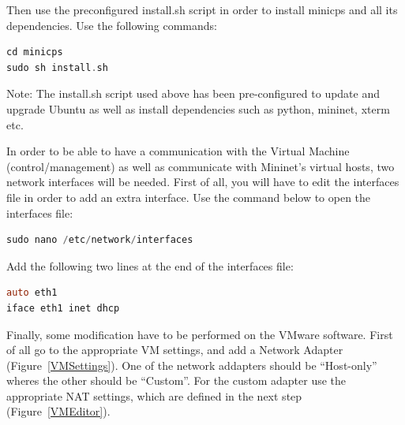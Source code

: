 \documentclass[book,a4paper,12pt]{memoir}
\begin{document}
Then use the preconfigured install.sh script in order to install minicps and all its dependencies.  Use the following commands:

\begin{lstlisting}[backgroundcolor = \color{ultralightgray}, language = C, xleftmargin = 0.1cm, framexleftmargin = 0.3em, showstringspaces=false]
cd minicps
sudo sh install.sh
\end{lstlisting}

Note: The install.sh script used above has been pre-configured to update and upgrade Ubuntu as well as install dependencies such as python, mininet, xterm etc.


In order to be able to have a communication with the Virtual Machine (control/management) as well as communicate with Mininet's virtual hosts, two network interfaces will be needed.  First of all, you will have to edit the interfaces file in order to add an extra interface.  Use the command below to open the interfaces file:

\begin{lstlisting}[backgroundcolor = \color{ultralightgray}, language = C, xleftmargin = 0.1cm, framexleftmargin = 0.3em, showstringspaces=false]
sudo nano /etc/network/interfaces
\end{lstlisting}

Add the following two lines at the end of the interfaces file:

\begin{lstlisting}[backgroundcolor = \color{ultralightgray}, language = C, xleftmargin = 0.1cm, framexleftmargin = 0.3em, showstringspaces=false]
auto eth1
iface eth1 inet dhcp
\end{lstlisting}

Finally, some modification have to be performed on the VMware software.  First of all go to the appropriate VM settings, and add a Network Adapter (Figure~\ref{VMSettings}).  One of the network addapters should be ``Host-only'' wheres the other should be ``Custom''.  For the custom adapter use the appropriate NAT settings, which are defined in the next step (Figure~\ref{VMEditor}).
\end{document}
